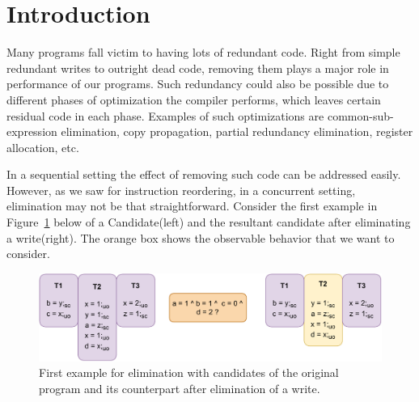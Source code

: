 \section{Introduction}

    Many programs fall victim to having lots of redundant code.
    Right from simple redundant writes to outright dead code, removing them plays a major role in performance of our programs. 
    Such redundancy could also be possible due to different phases of optimization the compiler performs, which leaves certain residual code in each phase.
    Examples of such optimizations are common-sub-expression elimination, copy propagation, partial redundancy elimination, register allocation, etc.
    
    In a sequential setting the effect of removing such code can be addressed easily.    
    However, as we saw for instruction reordering, in a concurrent setting, elimination may not be that straightforward. 
    Consider the first example in Figure~\ref{elim:example1(a)} below of a Candidate(left) and the resultant candidate after eliminating a write(right).
    The orange box shows the observable behavior that we want to consider. 
    \begin{figure}[H]
        \centering
        \includegraphics[scale=0.7]{6.Elimination/EliminationExample1(a).pdf}
        \caption{First example for elimination with candidates of the original program and its counterpart after elimination of a write.} 
        \label{elim:example1(a)}
    \end{figure}

